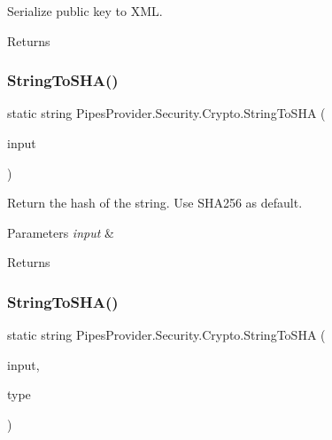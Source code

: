 Serialize public key to X\+ML. 

\begin{DoxyReturn}{Returns}

\end{DoxyReturn}
\mbox{\label{class_pipes_provider_1_1_security_1_1_crypto_aa02bcc81446a930930bb43ff46981f60}} 
\subsubsection{\texorpdfstring{String\+To\+S\+H\+A()}{StringToSHA()}\hspace{0.1cm}{\footnotesize\ttfamily [1/2]}}
{\footnotesize\ttfamily static string Pipes\+Provider.\+Security.\+Crypto.\+String\+To\+S\+HA (\begin{DoxyParamCaption}\item[{string}]{input }\end{DoxyParamCaption})\hspace{0.3cm}{\ttfamily [static]}}



Return the hash of the string. Use S\+H\+A256 as default. 


\begin{DoxyParams}{Parameters}
{\em input} & \\
\hline
\end{DoxyParams}
\begin{DoxyReturn}{Returns}

\end{DoxyReturn}
\mbox{\label{class_pipes_provider_1_1_security_1_1_crypto_af652a2847acd1502625c5496c4887274}} 
\subsubsection{\texorpdfstring{String\+To\+S\+H\+A()}{StringToSHA()}\hspace{0.1cm}{\footnotesize\ttfamily [2/2]}}
{\footnotesize\ttfamily static string Pipes\+Provider.\+Security.\+Crypto.\+String\+To\+S\+HA (\begin{DoxyParamCaption}\item[{string}]{input,  }\item[{\mbox{\hyperlink{class_pipes_provider_1_1_security_1_1_crypto_a6956e9aac98864917946b750dee3596e}{S\+H\+A\+Types}}}]{type }\end{DoxyParamCaption})\hspace{0.3cm}{\ttfamily [static]}}




